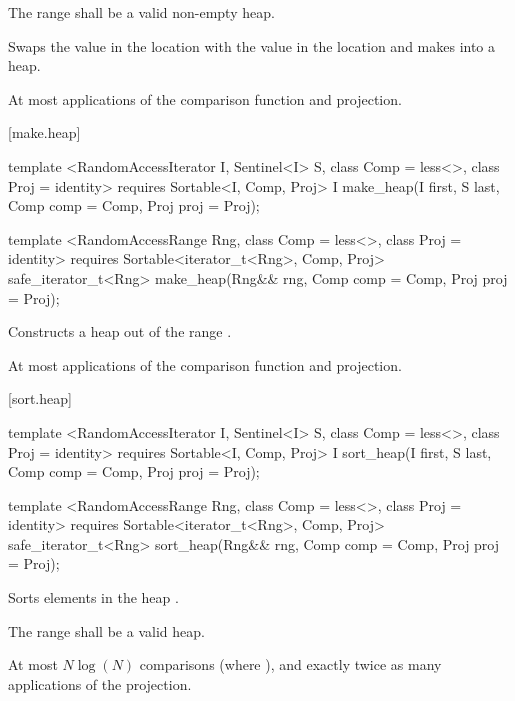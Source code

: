 \begin{itemdescr}
\pnum
\requires
The range
shall be a valid non-empty heap.

\pnum
\effects
Swaps the value in the location 
with the value in the location
and makes
into a heap.

\pnum
\returns {}

\pnum
\complexity
At most
applications of the comparison function and projection.
\end{itemdescr}

[make.heap]{}

%
\begin{itemdecl}
template <RandomAccessIterator I, Sentinel<I> S, class Comp = less<>,
    class Proj = identity>
  requires Sortable<I, Comp, Proj>
  I make_heap(I first, S last, Comp comp = Comp{}, Proj proj = Proj{});

template <RandomAccessRange Rng, class Comp = less<>, class Proj = identity>
  requires Sortable<iterator_t<Rng>, Comp, Proj>
  safe_iterator_t<Rng>
    make_heap(Rng&& rng, Comp comp = Comp{}, Proj proj = Proj{});
\end{itemdecl}

\begin{itemdescr}
\pnum
\effects
Constructs a heap out of the range
.

\pnum
\returns {}

\pnum
\complexity
At most
applications of the comparison function and projection.
\end{itemdescr}

[sort.heap]{}

%
\begin{itemdecl}
template <RandomAccessIterator I, Sentinel<I> S, class Comp = less<>,
    class Proj = identity>
  requires Sortable<I, Comp, Proj>
  I sort_heap(I first, S last, Comp comp = Comp{}, Proj proj = Proj{});

template <RandomAccessRange Rng, class Comp = less<>, class Proj = identity>
  requires Sortable<iterator_t<Rng>, Comp, Proj>
  safe_iterator_t<Rng>
    sort_heap(Rng&& rng, Comp comp = Comp{}, Proj proj = Proj{});
\end{itemdecl}

\begin{itemdescr}
\pnum
\effects
Sorts elements in the heap
.

\pnum
\requires The range  shall be a valid heap.

\pnum
\returns {}

\pnum
\complexity
At most $N \log(N)$
comparisons (where
), and exactly twice as many applications of the projection.
\end{itemdescr}

